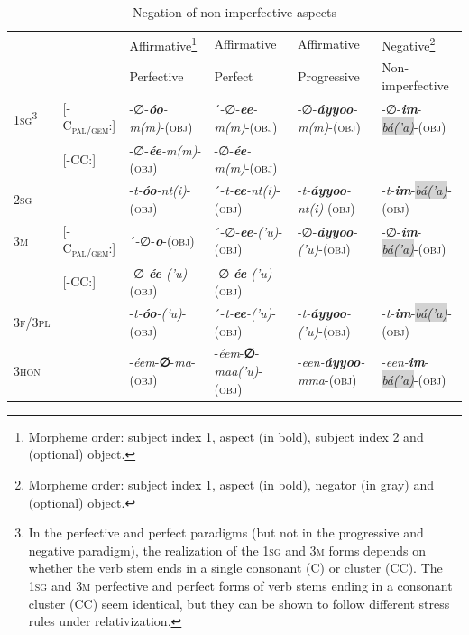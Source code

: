 \documentclass[output=paper,colorlinks,citecolor=brown,draftmode
]{langscibook}
\begin{document}
\begin{table}\small
\caption{Negation of non-imperfective aspects}
\label{tab:treis:3}
 \begin{tabular}{llllll}
  \lsptoprule
& & Affirmative\footnote{Morpheme order: subject index 1, aspect (in bold), subject index 2 and (optional) object.} & Affirmative & Affirmative & Negative\footnote{Morpheme order: subject index 1, aspect (in bold), negator (in gray) and (optional) object.}\\
& & Perfective & Perfect & Progressive & Non-imperfective\\ 
    \midrule 
\textsc{1sg}\footnote{In the perfective and perfect paradigms (but not in the progressive and negative paradigm), the realization of the \textsc{1sg} and \textsc{3m} forms depends on whether the verb stem ends in a single consonant (C) or cluster (CC). The \textsc{1sg} and \textsc{3m} perfective and perfect forms of verb stems ending in a consonant cluster (CC) seem identical, but they can be shown to follow different stress rules under relativization.} & [-C\textsubscript{\textsc{pal/gem}}:] & -∅-\textit{\textbf{óo}-m(m)}-(\textsc{obj}) &  ´-∅-\textit{\textbf{ee}-m(m)}-(\textsc{obj}) & -∅-\textit{\textbf{áyyoo}-m(m)}-(\textsc{obj}) & -∅-\textit{\textbf{im}}-\textit{\colorbox{lightgray}{bá('a)}}-(\textsc{obj}) \\
 & [-CC:] & -∅-\textit{\textbf{ée}-m(m)}-(\textsc{obj}) &  -∅-\textit{\textbf{ée}-m(m)}-(\textsc{obj}) & &   \\
\textsc{2sg} & & -\textit{t-\textbf{óo}-nt(i)}-(\textsc{obj}) & ´-\textit{t-\textbf{ee}-nt(i)}-(\textsc{obj}) & -\textit{t-\textbf{áyyoo}-nt(i)}-(\textsc{obj}) & -\textit{t-\textbf{im}}-\textit{\colorbox{lightgray}{bá('a)}}-(\textsc{obj})  \\
\textsc{3m} & [-C\textsubscript{\textsc{pal/gem}}:] & ´-∅-\textit{\textbf{o}}-(\textsc{obj}) &  ´-∅-\textit{\textbf{ee}-('u)}-(\textsc{obj}) & -∅-\textit{\textbf{áyyoo}-('u)}-(\textsc{obj}) & -∅-\textit{\textbf{im}}-\textit{\colorbox{lightgray}{bá('a)}}-(\textsc{obj}) \\
 & [-CC:] & -∅-\textit{\textbf{ée}-('u)}-(\textsc{obj}) &  -∅-\textit{\textbf{ée}-('u)}-(\textsc{obj}) & & \\
\textsc{3f/3pl} & & -\textit{t-\textbf{óo}-('u)}-(\textsc{obj}) & ´-\textit{t-\textbf{ee}-('u)}-(\textsc{obj}) & -\textit{t-\textbf{áyyoo}-('u)}-(\textsc{obj}) & -\textit{t-\textbf{im}}-\textit{\colorbox{lightgray}{bá('a)}}-(\textsc{obj})   \\
\textsc{3hon} & & -\textit{éem}-\textbf{∅}-\textit{ma}-(\textsc{obj}) & -\textit{éem}-\textbf{∅}-\textit{maa('u)}-(\textsc{obj}) &  -\textit{een-\textbf{áyyoo}-mma}-(\textsc{obj}) & -\textit{een-\textbf{im}}-\textit{\colorbox{lightgray}{bá('a)}}-(\textsc{obj})  \\

\end{tabular}
\end{table}
\end{document}
